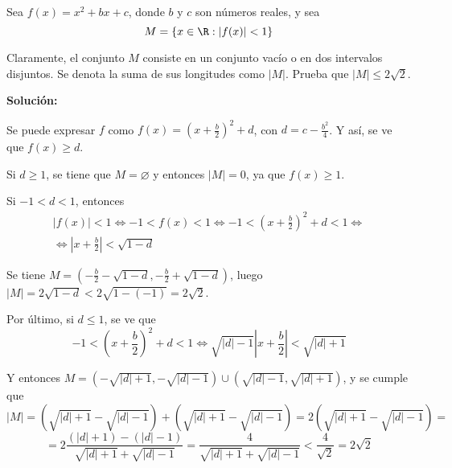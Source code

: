 \documentclass[../../main.tex]{subfiles}
\begin{document}
  \begin{shaded}
    Sea $f(x) = x^2 + b x + c$, donde $b$ y $c$ son números reales, y sea
    $$
    M = \{x \in \R : |f(x)| < 1\}
    $$

    Claramente, el conjunto $M$ consiste en un conjunto vacío o en dos intervalos disjuntos. Se denota la suma de sus longitudes como $|M|$. Prueba que $|M| \leq 2 \sqrt{2}$.
  \end{shaded}

  \textbf{Solución:}

  Se puede expresar $f$ como $f(x) = \left(x + \displaystyle\frac{b}{2}\right)^2 + d$, con $d = c - \displaystyle\frac{b^2}{4}$. Y así, se ve que $f(x) \geq d$.

  Si $d \geq 1$, se tiene que $M = \varnothing$ y entonces $|M| = 0$, ya que $f(x) \geq 1$.

  Si $-1 < d < 1$, entonces
  \begin{multline*}
    |f(x)| < 1 \iff -1 < f(x) < 1 \iff -1 < \left(x + \displaystyle\frac{b}{2}\right)^2 + d < 1 \iff \\ \iff
    \left|x + \frac{b}{2}\right| < \sqrt{1 - d}
  \end{multline*}

  Se tiene $M = \left(-\frac{b}{2} - \sqrt{1 - d}, -\frac{b}{2} + \sqrt{1 - d}\right)$, luego $|M| = 2\sqrt{1 - d} < 2 \sqrt{1 - (-1)} = 2\sqrt{2}$.

  Por último, si $d \leq 1$, se ve que
  $$
  -1 < \left(x + \displaystyle\frac{b}{2}\right)^2 + d < 1 \iff \sqrt{|d| - 1}\left|x + \frac{b}{2}\right| < \sqrt{|d| + 1}
  $$

  Y entonces $M = (-\sqrt{|d| + 1}, -\sqrt{|d| - 1}) \cup (\sqrt{|d| - 1}, \sqrt{|d| + 1})$, y se cumple que
  $$
  |M| = (\sqrt{|d| + 1} - \sqrt{|d| - 1}) + (\sqrt{|d| + 1} - \sqrt{|d| - 1}) = 2 (\sqrt{|d| + 1} - \sqrt{|d| - 1}) =
  $$
  $$
  = 2 \frac{(|d| + 1) - (|d| - 1)}{\sqrt{|d| + 1} + \sqrt{|d| - 1}} = \frac{4}{\sqrt{|d| + 1} + \sqrt{|d| - 1}} < \frac{4}{\sqrt{2}} = 2 \sqrt{2}
  $$
\end{document}
